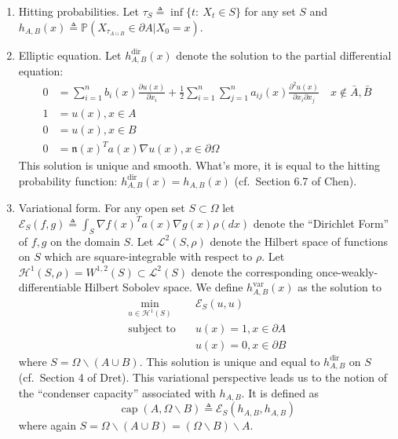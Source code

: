 \documentclass[12pt, nofootinbib,english, amsmath, amssymb, aps, priprint, graphicx,floatfix]{revtex4-1}
\theoremstyle{plain}
\theoremstyle{definition}
\theoremstyle{plain}
\newcommand{\normal}{{\mathfrak{n}}}
\newcommand{\capac}[2]{\ensuremath{\operatorname{cap}}(#1,#2)}
\begin{document}
\begin{enumerate}
\item Hitting probabilities.  Let $\tau_S \triangleq \inf\{t:\ X_t \in S\}$ for any set $S$ and $h_{A,B}(x) \triangleq \mathbb{P}(X_{\tau_{A\cup B}}\in \partial A|X_0=x)$.
    
\item Elliptic equation.  Let $h^\mathrm{dir}_{A,B}(x)$ denote the solution to the partial differential equation:
	    \begin{align}\label{eq:pde}
    0 &= \sum_{i = 1}^n b_i (x) \frac{\partial u
        (x)}{\partial x_i} + \frac{1}{2} \sum_{i = 1}^n \sum_{j = 1}^n a_{ij} (x)
        \frac{\partial^2 u (x)}{\partial x_i \partial x_j}\quad x\notin \bar A,\bar B\\
    1 &= u(x),x\in  A \nonumber \\ 
    0 &= u(x),x\in  B \nonumber \\
    0 &= \normal(x)^Ta(x)\nabla u(x), x \in \partial{\Omega} 
    \nonumber
    \end{align}
This solution is unique and smooth.\cite{lieberman1986mixed}  What's more, it is equal to the hitting probability function: $h^\mathrm{dir}_{A,B}(x)=h_{A,B}(x)$ (cf.\ Section 6.7 of Chen\cite{chen2012symmetric}).
\item Variational form.  For any open set $S\subset \Omega$ let $\mathscr{E}_{S}(f,g)\triangleq \int_S \nabla f(x)^T a(x) \nabla g(x) \rho(dx)$ denote the ``Dirichlet Form'' of $f,g$ on the domain $S$.  Let $\mathscr L^2(S,\rho)$ denote the Hilbert space of functions on $S$ which are square-integrable with respect to $\rho$.  Let $\mathcal{H}^1(S,\rho)=W^{1,2}(S) \subset \mathscr{L}^2(S)$ denote the corresponding once-weakly-differentiable Hilbert Sobolev space.  We define $h^\mathrm{var}_{A,B}(x)$ as the solution to 
    \begin{align*}
    \min_{u \in \mathcal H^1(S)} \quad & \mathscr{E}_S(u,u) \\
    \mbox{subject to} \quad & u(x)=1,x\in \partial A \\
     & u(x)=0,x\in \partial B
    \end{align*}
    where $S=\Omega \backslash (A\cup B)$.  This solution is unique and equal to $h^\mathrm{dir}_{A,B}$ on $S$ (cf.\ Section 4 of Dret\cite{dret2016partial}).  
This variational perspective leads us to the notion of the ``condenser capacity'' associated with $h_{A,B}$.  It is defined as 
    \[
    \capac{A}{\Omega \backslash B} \triangleq \mathscr{E}_S(h_{A,B},h_{A,B})
    \]
    where again $S=\Omega \backslash (A\cup B)=(\Omega \backslash B) \backslash A$.  
\end{enumerate}
\end{document}
